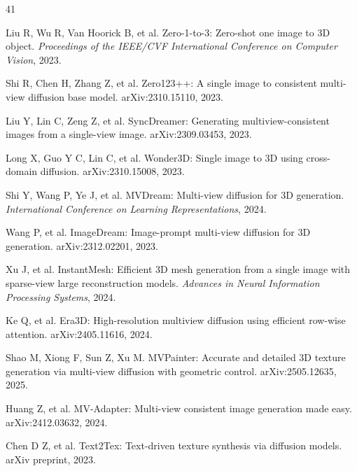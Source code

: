 \documentclass[times,twocolumn,final]{elsarticle}
\providecommand{\DIFdel}[1]{{\protect\color{red} \scriptsize #1}} %
\providecommand{\DIFaddbegin}{} %
\providecommand{\DIFaddend}{} %
\providecommand{\DIFdelbegin}{} %
\providecommand{\DIFdelend}{} %
\newcommand{\DIFscaledelfig}{0.5}
\newlength{\DIFdelgraphicswidth} %
\newlength{\DIFdelgraphicsheight} %
\newcommand{\DIFaddincludegraphics}[2][]{{\color{blue}\fbox{\DIFOincludegraphics[#1]{#2}}}} %
\newcommand{\DIFdelincludegraphics}[2][]{%
\sbox{\DIFdelgraphicsbox}{\DIFOincludegraphics[#1]{#2}}%
\settoboxwidth{\DIFdelgraphicswidth}{\DIFdelgraphicsbox} %
\settoboxtotalheight{\DIFdelgraphicsheight}{\DIFdelgraphicsbox} %
\scalebox{\DIFscaledelfig}{%
\parbox[b]{\DIFdelgraphicswidth}{\usebox{\DIFdelgraphicsbox}\\[-\baselineskip] \rule{\DIFdelgraphicswidth}{0em}}\llap{\resizebox{\DIFdelgraphicswidth}{\DIFdelgraphicsheight}{%
\setlength{\unitlength}{\DIFdelgraphicswidth}%
\begin{picture}(1,1)%
\thicklines\linethickness{2pt} %
{\color[rgb]{1,0,0}\put(0,0){\framebox(1,1){}}}%
{\color[rgb]{1,0,0}\put(0,0){\line( 1,1){1}}}%
{\color[rgb]{1,0,0}\put(0,1){\line(1,-1){1}}}%
\end{picture}%
}\hspace*{3pt}}} %
} %
\DeclareRobustCommand{\DIFaddbegin}{\DIFOaddbegin \let\includegraphics\DIFaddincludegraphics} %
\DeclareRobustCommand{\DIFaddend}{\DIFOaddend \let\includegraphics\DIFOincludegraphics} %
\DeclareRobustCommand{\DIFdelbegin}{\DIFOdelbegin \let\includegraphics\DIFdelincludegraphics} %
\DeclareRobustCommand{\DIFdelend}{\DIFOaddend \let\includegraphics\DIFOincludegraphics} %
\begin{document}
\DIFdelbegin %
\DIFdelend \DIFaddbegin \begin{thebibliography}{41}
\DIFaddend 


Liu R, Wu R, Van Hoorick B, et al. Zero-1-to-3: Zero-shot one image to 3D object. \textit{Proceedings of the IEEE/CVF International Conference on Computer Vision}, 2023.

Shi R, Chen H, Zhang Z, et al. Zero123++: A single image to consistent multi-view diffusion base model. arXiv:2310.15110, 2023.

Liu Y, Lin C, Zeng Z, et al. SyncDreamer: Generating multiview-consistent images from a single-view image. arXiv:2309.03453, 2023.

Long X, Guo Y C, Lin C, et al. Wonder3D: Single image to 3D using cross-domain diffusion. arXiv:2310.15008, 2023.

Shi Y, Wang P, Ye J, et al. MVDream: Multi-view diffusion for 3D generation. \textit{International Conference on Learning Representations}, 2024.

Wang P, et al. ImageDream: Image-prompt multi-view diffusion for 3D generation. arXiv:2312.02201, 2023.

Xu J, et al. InstantMesh: Efficient 3D mesh generation from a single image with sparse-view large reconstruction models. \textit{Advances in Neural Information Processing Systems}, 2024.

Ke Q, et al. Era3D: High-resolution multiview diffusion using efficient row-wise attention. arXiv:2405.11616, 2024.

\DIFdelbegin %
\DIFdel{Shao M, Xiong F, Sun Z, Xu M. MVPainter: Accurate and detailed 3D texture generation via multi-view diffusion with geometric control. arXiv:2505.12635, 2025.
}%

\DIFdel{Huang Z, et al. MV-Adapter: Multi-view consistent image generation made easy. arXiv:2412.03632, 2024.
}%

\DIFdelend {}
Chen D Z, et al. Text2Tex: Text-driven texture synthesis via diffusion models. arXiv preprint, 2023.


\end{thebibliography}
\end{document}
